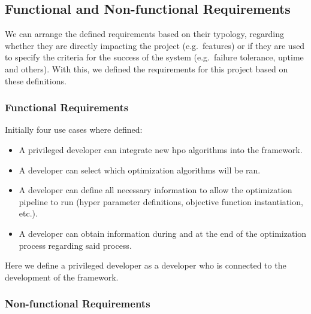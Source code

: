 
\subsection{Functional and Non-functional Requirements}


We can arrange the defined requirements based on their typology, regarding whether they are directly impacting the project (e.g.\ features) or if they are used to specify the criteria for the success of the system (e.g.\ failure tolerance, uptime and others). With this, we defined the requirements for this project based on these definitions.

\subsubsection{Functional Requirements}

Initially four use cases where defined:


\begin{itemize}
	\item A privileged developer can integrate new \acrshort{hpo} algorithms into the framework.
	\item A developer can select which optimization algorithms will be ran.
	\item A developer can define all necessary information to allow the optimization pipeline to run (hyper parameter definitions, objective function instantiation, etc.).
	\item A developer can obtain information during and at the end of the optimization process regarding said process.
\end{itemize}

Here we define a privileged developer as a developer who is connected to the development of the framework.

\subsubsection{Non-functional Requirements}

